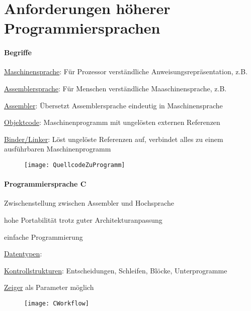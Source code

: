 \section{Anforderungen höherer Programmiersprachen}
\label{sec:anforderungen}

\paragraph{Begriffe}
\begin{items}
  \item \underline{Maschinensprache}: Für Prozessor verständliche Anweisungsrepräsentation, z.B. 
  \item \underline{Assemblersprache}: Für Menschen verständliche Maaschinensprache, z.B. 
  \item \underline{Assembler}: Übersetzt Assemblersprache eindeutig in Maschinensprache
  \item \underline{Objektcode}: Maschinenprogramm mit ungelösten externen Referenzen
  \item \underline{Binder/Linker}: Löst ungelöste Referenzen auf, verbindet alles zu einem ausführbaren Maschinenprogramm
\end{items}
\begin{figure}[H]
  \centering
  \texttt{[image: QuellcodeZuProgramm]}
\label{QuellcodeZuProgramm}
\end{figure}

\paragraph{Programmiersprache C}
\begin{items}
  \item Zwischenstellung zwischen Assembler und Hochsprache
  \item hohe Portabilität trotz guter Architekturanpassung
  \item einfache Programmierung
  \item \underline{Datentypen}: 
  \item \underline{Kontrollstrukturen}: Entscheidungen, Schleifen, Blöcke, Unterprogramme
  \item \underline{Zeiger} als Parameter möglich
\end{items}
\begin{figure}[H]
  \centering
  \texttt{[image: CWorkflow]}
\label{CWorkflow}
\end{figure}

